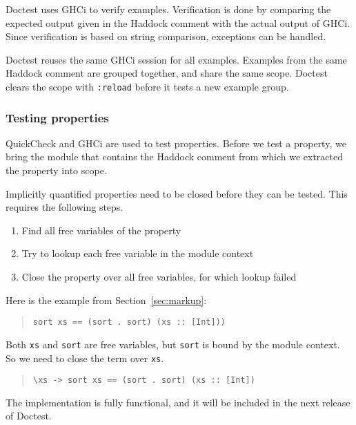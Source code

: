 \documentclass[preprint]{sigplanconf}
\begin{document}
Doctest uses GHCi to verify examples.  Verification is done by
comparing the expected output given in the Haddock comment with the
actual output of GHCi.  Since verification is based on string
comparison, exceptions can be handled.

Doctest reuses the same GHCi session for all examples.
Examples from the same Haddock comment are grouped together,
and share the same scope.
Doctest clears the scope with \verb|:reload| before it tests a new
example group.

\subsubsection{Testing properties}

\noindent QuickCheck and GHCi are used to test properties.  Before we
test a property, we bring the module that contains the Haddock comment
from which we extracted the property into scope.

Implicitly quantified properties need to be closed before they can be
tested.  This requires the following steps.
\begin{enumerate}
    \item
        Find all free variables of the property
    \item
        Try to lookup each free variable in the module context
    \item
        Close the property over all free variables, for which lookup
        failed
\end{enumerate}

\noindent Here is the example from Section~\ref{sec:markup}:

\begin{quote}
\small
\begin{verbatim}
sort xs == (sort . sort) (xs :: [Int]))
\end{verbatim}
\end{quote}

\noindent Both \verb|xs| and \verb|sort| are free variables, but
\verb|sort| is bound by the module context.  So we need to close the
term over \verb|xs|.

\begin{quote}
\small
\begin{verbatim}
\xs -> sort xs == (sort . sort) (xs :: [Int])
\end{verbatim}
\end{quote}

The implementation is fully functional, and it will be included in the
next release of Doctest.
\end{document}
